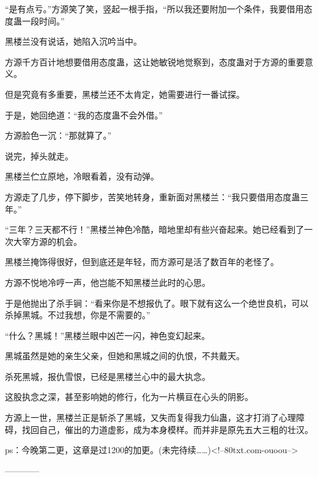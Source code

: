 \begin{this_body}
“是有点亏。”方源笑了笑，竖起一根手指，“所以我还要附加一个条件，我要借用态度蛊一段时间。”

黑楼兰没有说话，她陷入沉吟当中。

方源千方百计地想要借用态度蛊，这让她敏锐地觉察到，态度蛊对于方源的重要意义。

但是究竟有多重要，黑楼兰还不太肯定，她需要进行一番试探。

于是，她回绝道：“我的态度蛊不会外借。”

方源脸色一沉：“那就算了。”

说完，掉头就走。

黑楼兰伫立原地，冷眼看着，没有动弹。

方源走了几步，停下脚步，苦笑地转身，重新面对黑楼兰：“我只要借用态度蛊三年。”

“三年？三天都不行！”黑楼兰神色冷酷，暗地里却有些兴奋起来。她已经看到了一次大宰方源的机会。

黑楼兰掩饰得很好，但到底还是年轻，而方源可是活了数百年的老怪了。

方源不悦地冷哼一声，他岂能不知黑楼兰此时的心思。

于是他抛出了杀手锏：“看来你是不想报仇了。眼下就有这么一个绝世良机，可以杀掉黑城。不过我想，你是不需要的。”

“什么？黑城！”黑楼兰眼中凶芒一闪，神色变幻起来。

黑城虽然是她的亲生父亲，但她和黑城之间的仇恨，不共戴天。

杀死黑城，报仇雪恨，已经是黑楼兰心中的最大执念。

这股执念之深，甚至影响她的修行，化为一片横亘在心头的阴影。

方源上一世，黑楼兰正是斩杀了黑城，又失而复得我力仙蛊，这才打消了心理障碍，找回自己，催出的力道虚影，成为本身模样。而并非是原先五大三粗的壮汉。

ps：今晚第二更，这章是过1200的加更。(未完待续……)<!--80txt.com-ouoou-->

------------

\end{this_body}

